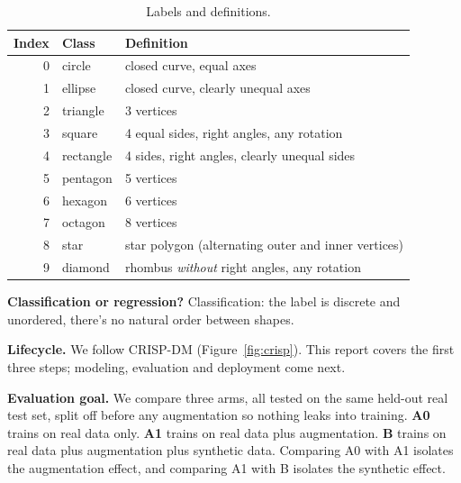 \documentclass[11pt]{article}
\begin{document}
\begin{table}[H]
\centering
\caption{Labels and definitions.}
\label{tab:labels}
\small
\begin{tabular}{@{}rll@{}}
\toprule
Index & Class & Definition \\
\midrule
0 & circle    & closed curve, equal axes \\
1 & ellipse   & closed curve, clearly unequal axes \\
2 & triangle  & 3 vertices \\
3 & square    & 4 equal sides, right angles, any rotation \\
4 & rectangle & 4 sides, right angles, clearly unequal sides \\
5 & pentagon  & 5 vertices \\
6 & hexagon   & 6 vertices \\
7 & octagon   & 8 vertices \\
8 & star      & star polygon (alternating outer and inner vertices) \\
9 & diamond   & rhombus \emph{without} right angles, any rotation \\
\bottomrule
\end{tabular}
\end{table}

\textbf{Classification or regression?} Classification: the label is
discrete and unordered, there's no natural order between shapes.

\textbf{Lifecycle.} We follow CRISP-DM (Figure~\ref{fig:crisp}). This
report covers the first three steps; modeling, evaluation and deployment come next.

\textbf{Evaluation goal.} We compare three arms, all tested on the same
held-out real test set, split off before any augmentation so nothing leaks
into training. \textbf{A0} trains on real data only. \textbf{A1} trains on
real data plus augmentation. \textbf{B} trains on real data plus augmentation
plus synthetic data. Comparing A0 with A1 isolates the augmentation effect,
and comparing A1 with B isolates the synthetic effect.
\end{document}
